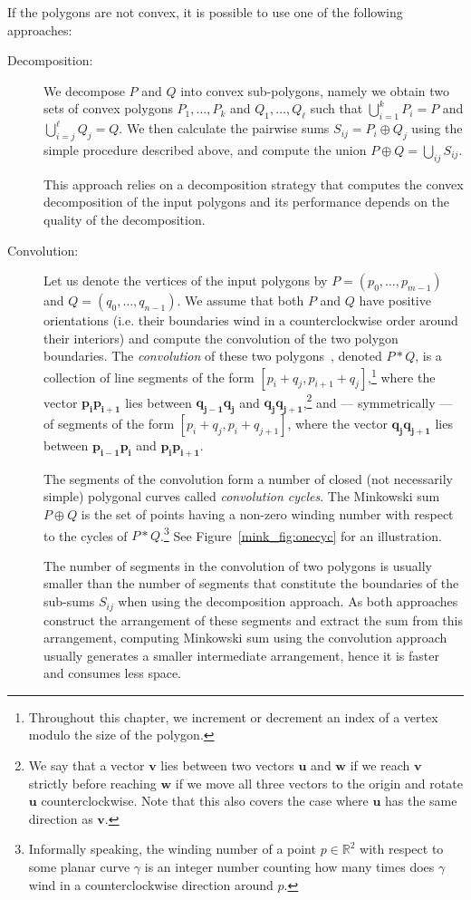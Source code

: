 If the polygons are not convex, it is possible to use one of the following
approaches:
\begin{description}
\item[Decomposition:]
We decompose $P$ and $Q$ into convex sub-polygons, namely we obtain two
sets of convex polygons $P_1, \ldots, P_k$ and $Q_1, \ldots, Q_\ell$ such
that $\bigcup_{i = 1}^{k}{P_i} = P$ and $\bigcup_{i = j}^{\ell}{Q_j} = Q$.
We then calculate the pairwise sums $S_{ij} = P_i \oplus Q_j$ using the
simple procedure described above, and compute the union $P \oplus Q =
\bigcup_{ij}{S_{ij}}$.

This approach relies on a decomposition strategy that computes the convex
decomposition of the input polygons and its performance depends on the
quality of the decomposition.
%
\item[Convolution:]
Let us denote the vertices of the input polygons by
$P = \left( p_0, \ldots, p_{m-1} \right)$ and
$Q = \left( q_0, \ldots, q_{n-1} \right)$. We assume that both $P$ and $Q$
have positive orientations (i.e. their boundaries wind in a counterclockwise
order around their interiors) and compute the convolution of the two polygon
boundaries. The {\em convolution} of these two polygons~\cite{grs-kfcg-83},
denoted $P * Q$, is a collection of line segments of the form
$[p_i + q_j, p_{i+1} + q_j]$,\footnote{Throughout this chapter, we increment
or decrement an index of a vertex modulo the size of the polygon.}
where the vector ${\mathbf{p_i p_{i+1}}}$
lies between ${\mathbf{q_{j-1} q_j}}$ and ${\mathbf{q_j
q_{j+1}}}$,\footnote{We say that a vector ${\mathbf v}$ lies between
two vectors ${\mathbf u}$ and ${\mathbf w}$ if we reach ${\mathbf v}$ strictly
before reaching ${\mathbf w}$ if we move all three vectors to the origin
and rotate ${\mathbf u}$ counterclockwise. Note that this also covers
the case where ${\mathbf u}$ has the same direction as ${\mathbf v}$.} and
--- symmetrically --- of segments of the form $[p_i + q_j, p_i + q_{j+1}]$,
where the vector ${\mathbf{q_j q_{j+1}}}$ lies between
${\mathbf{p_{i-1} p_i}}$ and ${\mathbf{p_i p_{i+1}}}$.

The segments of the convolution form a number of closed (not
necessarily simple) polygonal curves called \emph{convolution
cycles}. The Minkowski sum $P \oplus Q$ is the set of points
having a non-zero winding number with respect to the cycles
of $P * Q$.\footnote{Informally speaking, the winding number of a point
$p \in \mathbb{R}^2$ with respect to some planar curve $\gamma$ is an
integer number counting how many times does $\gamma$ wind in a
counterclockwise direction around $p$.} See Figure~\ref{mink_fig:onecyc}
for an illustration.

The number of segments in the convolution of two polygons is usually
smaller than the number of segments that constitute the boundaries of the
sub-sums $S_{ij}$ when using the decomposition approach. As both approaches
construct the arrangement of these segments and extract the sum from this
arrangement, computing Minkowski sum using the convolution approach usually
generates a smaller intermediate arrangement, hence it is faster and
consumes less space.
\end{description}

